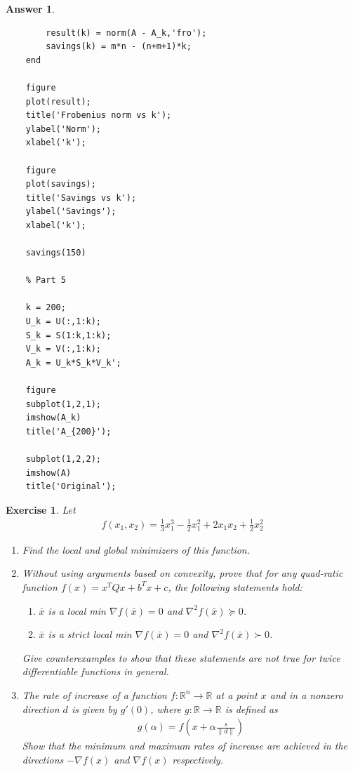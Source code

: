 \documentclass[12pt]{article}
\theoremstyle{colon}
\newtheorem{exercise}{Exercise}
\newtheorem*{answer}{Answer}
\begin{document}
\begin{answer}
\begin{lstlisting}[style=Matlab-editor, basicstyle=\scriptsize]
        % Calculate Frobenius norm
        result(k) = norm(A - A_k,'fro');
        savings(k) = m*n - (n+m+1)*k;
    end

    figure
    plot(result);
    title('Frobenius norm vs k');
    ylabel('Norm');
    xlabel('k');

    figure
    plot(savings);
    title('Savings vs k');
    ylabel('Savings');
    xlabel('k');

    savings(150)

    % Part 5

    k = 200;
    U_k = U(:,1:k);
    S_k = S(1:k,1:k);
    V_k = V(:,1:k);
    A_k = U_k*S_k*V_k';

    figure
    subplot(1,2,1);
    imshow(A_k)
    title('A_{200}');

    subplot(1,2,2);
    imshow(A)
    title('Original');
  \end{lstlisting}
\end{answer}

\clearpage

\begin{exercise}
  Let
  \begin{gather*}
    f(x_1, x_2) = \frac{1}{3} x_1^3 - \frac{1}{2} x_1^2 + 2 x_1 x_2 + \frac{1}{2} x_2^2
  \end{gather*}

  \begin{enumerate}[label=\arabic*)]
    \item Find the local and global minimizers of this function.

    \item Without using arguments based on convexity, prove that for any quad-ratic function $f(x) = x^T Q x + b^T x + c$, the following statements hold:
    \begin{enumerate}[label=\alph*)]
      \item $\bar{x}$ is a local min $\nabla f(\bar{x}) = 0$ and $\nabla^2 f(\bar{x}) \succeq 0$.
      \item$\bar{x}$ is a strict local min $\nabla f(\bar{x}) = 0$ and $\nabla^2 f(\bar{x}) \succ 0$.
    \end{enumerate}
    Give counterexamples to show that these statements are not true for twice differentiable functions in general.

    \item The rate of increase of a function $f: \mathbb{R}^n \rightarrow \mathbb{R}$ at a point $x$ and in a nonzero direction $d$ is given by $g'(0)$, where $g: \mathbb{R} \rightarrow \mathbb{R}$ is defined as
      \begin{gather*}
        g(\alpha) = f \left( x + \alpha \frac{s}{\lVert d \rVert} \right)
      \end{gather*}
      Show that the minimum and maximum rates of increase are achieved in the directions $- \nabla f(x)$ and $\nabla f(x)$ respectively.
  \end{enumerate}
\end{exercise}
\end{document}
